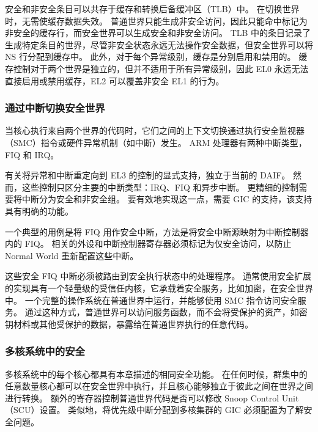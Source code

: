 安全和非安全条目可以共存于缓存和转换后备缓冲区（TLB）中。
在切换世界时，无需使缓存数据失效。
普通世界只能生成非安全访问，因此只能命中标记为非安全的缓存行，而安全世界可以生成安全和非安全访问。
TLB 中的条目记录了生成特定条目的世界，尽管非安全状态永远无法操作安全数据，但安全世界可以将 NS 行分配到缓存中。
此外，对于每个异常级别，缓存是分别启用和禁用的。
缓存控制对于两个世界是独立的，但并不适用于所有异常级别，因此 EL0 永远无法直接启用或禁用缓存，EL2 可以覆盖非安全 EL1 的行为。

\subsubsection{通过中断切换安全世界}

当核心执行来自两个世界的代码时，它们之间的上下文切换通过执行安全监视器（SMC）指令或硬件异常机制（如中断）发生。
ARM 处理器有两种中断类型，FIQ 和 IRQ。


有关将异常和中断重定向到 EL3 的控制的显式支持，独立于当前的 DAIF。
然而，这些控制只区分主要的中断类型：IRQ、FIQ 和异步中断。
更精细的控制需要将中断分为安全和非安全组。
要有效地实现这一点，需要 GIC 的支持，该支持具有明确的功能。

一个典型的用例是将 FIQ 用作安全中断，方法是将安全中断源映射为中断控制器内的 FIQ。
相关的外设和中断控制器寄存器必须标记为仅安全访问，以防止 Normal World 重新配置这些中断。


这些安全 FIQ 中断必须被路由到安全执行状态中的处理程序。
通常使用安全扩展的实现具有一个轻量级的受信任内核，它承载着安全服务，比如加密，在安全世界中。
一个完整的操作系统在普通世界中运行，并能够使用 SMC 指令访问安全服务。
通过这种方式，普通世界可以访问服务函数，而不会将受保护的资产，如密钥材料或其他受保护的数据，暴露给在普通世界执行的任意代码。

\subsubsection{多核系统中的安全}

多核系统中的每个核心都具有本章描述的相同安全功能。
在任何时候，群集中的任意数量核心都可以在安全世界中执行，并且核心能够独立于彼此之间在世界之间进行转换。
额外的寄存器控制普通世界代码是否可以修改 Snoop Control Unit（SCU）设置。
类似地，将优先级中断分配到多核集群的 GIC 必须配置为了解安全问题。


